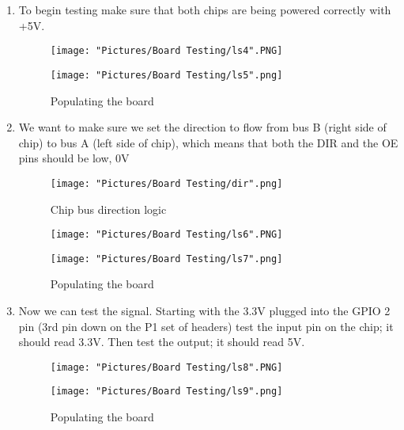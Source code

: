 \documentclass[12pt]{article}
\begin{document}
\begin{enumerate}
	\item To begin testing make sure that both chips are being powered correctly with +5V.
	
\begin{figure}[H]
 	\centering
  	\begin{minipage}[b]{0.45\textwidth}
		\texttt{[image: "Pictures/Board Testing/ls4".PNG]}
  	\end{minipage}
  	\hfill
  	\begin{minipage}[b]{0.45\textwidth}
    		\texttt{[image: "Pictures/Board Testing/ls5".png]}
  	\end{minipage}
	\caption{Populating the board}
	\label{ls2}
\end{figure}

	\item We want to make sure we set the direction to flow from bus B (right side of chip) to bus A (left side of chip), which means that both the DIR and the OE pins should be low, 0V

\begin{figure}[H]
  	\centering
    	\texttt{[image: "Pictures/Board Testing/dir".png]}
 	\caption{Chip bus direction logic}
	\label{dir}
\end{figure}

\begin{figure}[H]
 	\centering
  	\begin{minipage}[b]{0.45\textwidth}
		\texttt{[image: "Pictures/Board Testing/ls6".PNG]}
  	\end{minipage}
  	\hfill
  	\begin{minipage}[b]{0.45\textwidth}
    		\texttt{[image: "Pictures/Board Testing/ls7".png]}
  	\end{minipage}
	\caption{Populating the board}
	\label{ls2}
\end{figure}

	\item Now we can test the signal. Starting with the 3.3V plugged into the GPIO 2 pin (3rd pin down on the P1 set of headers) test the input pin on the chip; it should read 3.3V. Then test the output; it should read 5V.

\begin{figure}[H]
 	\centering
  	\begin{minipage}[b]{0.45\textwidth}
		\texttt{[image: "Pictures/Board Testing/ls8".PNG]}
  	\end{minipage}
  	\hfill
  	\begin{minipage}[b]{0.45\textwidth}
    		\texttt{[image: "Pictures/Board Testing/ls9".png]}
  	\end{minipage}
	\caption{Populating the board}
	\label{ls2}
\end{figure}


\end{enumerate}
\end{document}
